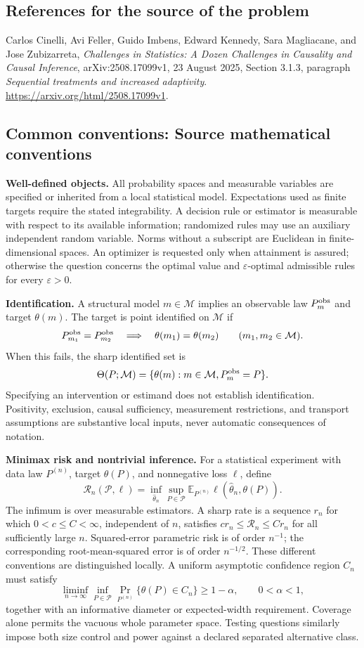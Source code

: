 \documentclass[11pt,a4paper]{article}
\newcommand{\E}{\mathbb E}
\begin{document}
\subsection*{References for the source of the problem}
Carlos Cinelli, Avi Feller, Guido Imbens, Edward Kennedy, Sara Magliacane, and Jose Zubizarreta, \emph{Challenges in Statistics: A Dozen Challenges in Causality and Causal Inference}, arXiv:2508.17099v1, 23 August 2025, Section 3.1.3, paragraph \emph{Sequential treatments and increased adaptivity}. \url{https://arxiv.org/html/2508.17099v1}.

\subsection*{Common conventions: Source mathematical conventions}

\textbf{Well-defined objects.}
All probability spaces and measurable variables are specified or inherited
from a local statistical model. Expectations used as finite targets require
the stated integrability. A decision rule or estimator is measurable with
respect to its available information; randomized rules may use an auxiliary
independent random variable. Norms without a subscript are Euclidean in
finite-dimensional spaces. An optimizer is requested only when attainment
is assured; otherwise the question concerns the optimal value and
$\varepsilon$-optimal admissible rules for every $\varepsilon>0$.

\textbf{Identification.}
A structural model $m\in\mathcal M$ implies an observable law
$P_m^{\rm obs}$ and target $\theta(m)$. The target is point identified on
$\mathcal M$ if
\[
 P_{m_1}^{\rm obs}=P_{m_2}^{\rm obs}
 \quad\Longrightarrow\quad\theta(m_1)=\theta(m_2)
 \qquad(m_1,m_2\in\mathcal M).
\]
When this fails, the sharp identified set is
\[
 \Theta(P;\mathcal M)=\{\theta(m):m\in\mathcal M,
                                  P_m^{\rm obs}=P\}.
\]
Specifying an intervention or estimand does not establish identification.
Positivity, exclusion, causal sufficiency, measurement restrictions, and
transport assumptions are substantive local inputs, never automatic
consequences of notation.

\textbf{Minimax risk and nontrivial inference.}
For a statistical experiment with data law $P^{(n)}$, target $\theta(P)$,
and nonnegative loss $\ell$, define
\[
 \mathcal R_n(\mathcal P,\ell)
   =\inf_{\widehat\theta_n}\sup_{P\in\mathcal P}
      \E_{P^{(n)}}\ell(\widehat\theta_n,\theta(P)).
\]
The infimum is over measurable estimators. A sharp rate is a sequence
$r_n$ for which $0<c\leq C<\infty$, independent of $n$, satisfies
$c r_n\leq\mathcal R_n\leq C r_n$ for all sufficiently large $n$.
Squared-error parametric risk is of order $n^{-1}$; the corresponding
root-mean-squared error is of order $n^{-1/2}$. These different conventions
are distinguished locally. A uniform asymptotic confidence region $C_n$
must satisfy
\[
 \liminf_{n\to\infty}\inf_{P\in\mathcal P}
     \Pr_{P^{(n)}}\{\theta(P)\in C_n\}\geq 1-\alpha,
 \qquad 0<\alpha<1,
\]
together with an informative diameter or expected-width requirement.
Coverage alone permits the vacuous whole parameter space. Testing questions
similarly impose both size control and power against a declared separated
alternative class.
\end{document}
